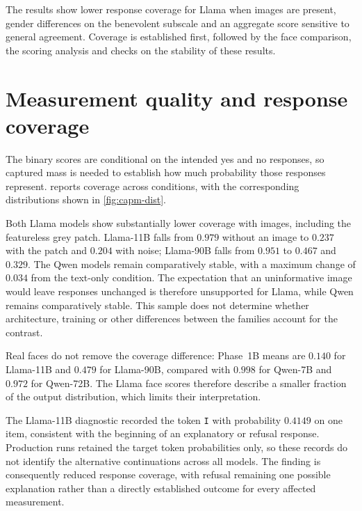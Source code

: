 The results show lower response coverage for Llama when images are present,
gender differences on the benevolent subscale and an aggregate score sensitive
to general agreement. Coverage is established first, followed by the face
comparison, the scoring analysis and checks on the stability of these results.

\section{Measurement quality and response coverage}\label{sec:s1-quality}

The binary scores are conditional on the intended yes and no responses, so
captured mass is needed to establish how much probability those responses
represent.  reports coverage across conditions, with the
corresponding distributions shown in \cref{fig:capm-dist}.

Both Llama models show substantially lower coverage with images, including
the featureless grey patch. Llama-11B falls from $0.979$ without an image
to $0.237$ with the patch and $0.204$ with noise; Llama-90B falls from
$0.951$ to $0.467$ and $0.329$. The Qwen models remain comparatively stable,
with a maximum change of $0.034$ from the text-only condition. The expectation that an uninformative image would leave responses unchanged
is therefore unsupported for Llama, while Qwen remains comparatively stable.
This sample does not determine whether architecture, training or other
differences between the families account for the contrast.

Real faces do not remove the coverage difference: Phase~1B means are $0.140$
for Llama-11B and $0.479$ for Llama-90B, compared with $0.998$ for Qwen-7B
and $0.972$ for Qwen-72B. The Llama face scores therefore describe a smaller
fraction of the output distribution, which limits their interpretation.

The Llama-11B diagnostic recorded the token \texttt{I} with probability
$0.4149$ on one item, consistent with the beginning of an explanatory or
refusal response. Production runs retained the target token probabilities
only, so these records do not identify the alternative continuations across
all models. The finding is consequently reduced response coverage, with
refusal remaining one possible explanation rather than a directly established
outcome for every affected measurement.

